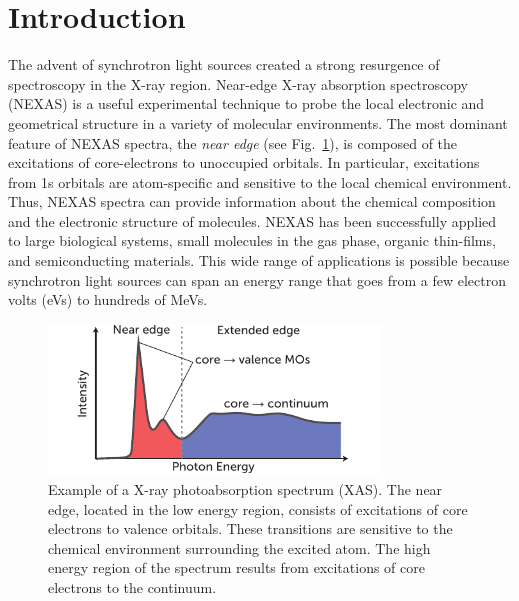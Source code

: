 \documentclass[8.5pt,twoside,twocolumn]{article}
\begin{document}
\section{Introduction}
The advent of synchrotron light sources created a strong resurgence of spectroscopy in the X-ray region. \cite{mcmillan_synchrotronproposed_1945} Near-edge X-ray absorption spectroscopy (NEXAS) is a useful experimental technique to probe the local electronic and geometrical structure in a variety of molecular environments.
The most dominant feature of NEXAS spectra, the \textit{near edge}  (see Fig.~\ref{fig:nexas-illustration}), is composed of the excitations of core-electrons to unoccupied orbitals.
In particular, excitations from 1s orbitals are atom-specific and sensitive to the local chemical environment.
Thus, NEXAS spectra can provide information about the chemical composition and the electronic structure of molecules.
NEXAS has been successfully applied to large biological systems, \cite{hua_refinement_2010} small molecules in the gas phase,\cite{contini_gas-phase_2001} organic thin-films,\cite{hahner_near_2006} and semiconducting materials.\cite{guo_electronic_2011} This wide range of applications is possible because synchrotron light sources can span an energy range that goes from a few electron volts (eVs) \cite{feneberg_synchrotron-based_2011} to hundreds of MeVs.\cite{nakazato_observation_1989}

\begin{figure}[!b]
\centering
\includegraphics[width=8.8cm]{NEXASIllustration.pdf}
\caption{Example of a X-ray photoabsorption spectrum (XAS).  The near edge, located in the low energy region, consists of excitations of core electrons to valence orbitals.  These transitions are sensitive to the chemical environment surrounding the excited atom.  The high energy region of the spectrum results from excitations of core electrons to the continuum.}
\label{fig:nexas-illustration}
\end{figure}
\end{document}
